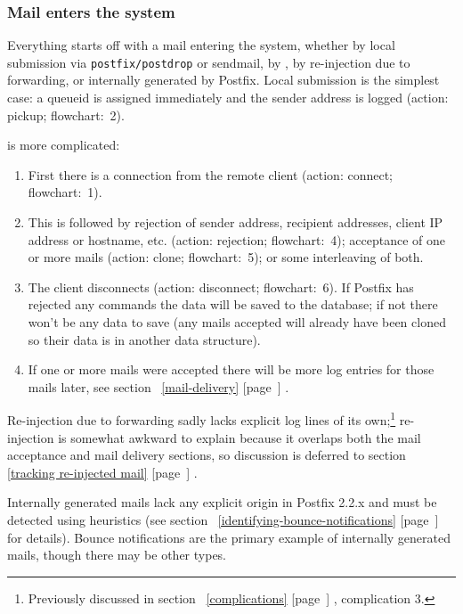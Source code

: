 \documentclass[a4paper,12pt,draft]{article}
\newcommand{\refwithpage}[1]{%
    \empty{}\ref{#1} [page~\pageref{#1}]%
}
\newcommand{\daemon}[1]{%
    \texttt{postfix/#1}%
}
\begin{document}
\subsubsection{Mail enters the system}

\label{mail-enters-the-system}

Everything starts off with a mail entering the system, whether by local
submission via \daemon{postdrop} or sendmail, by \SMTP{}, by re-injection
due to forwarding, or internally generated by Postfix.  Local submission is
the simplest case: a queueid is assigned immediately and the sender address
is logged (action: pickup; flowchart:~2).

\SMTP{} is more complicated: 

\begin{enumerate}

    \item First there is a connection from the remote client
        (action: connect; flowchart:~1).

    \item This is followed by rejection of sender address, recipient
        addresses, client IP address or hostname, etc. (action: rejection;
        flowchart:~4); acceptance of one or more mails (action: clone;
        flowchart:~5); or some interleaving of both.

    \item The client disconnects (action: disconnect; flowchart:~6).  If
        Postfix has rejected any \SMTP{} commands the data will be saved to
        the database; if not there won't be any data to save (any mails
        accepted will already have been cloned so their data is in another
        data structure).

    \item If one or more mails were accepted there will be more log entries
        for those mails later, see section~\refwithpage{mail-delivery}.

\end{enumerate}

Re-injection due to forwarding sadly lacks explicit log lines of its
own;\footnote{Previously discussed in section~\refwithpage{complications},
complication 3.} re-injection is somewhat awkward to explain because it
overlaps both the mail acceptance and mail delivery sections, so discussion
is deferred to section~\refwithpage{tracking re-injected mail}.

Internally generated mails lack any explicit origin in Postfix 2.2.x and
must be detected using heuristics (see
section~\refwithpage{identifying-bounce-notifications} for details).
Bounce notifications are the primary example of internally generated mails,
though there may be other types.
\end{document}
